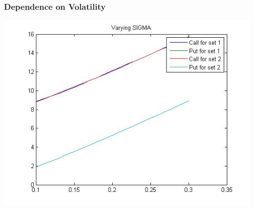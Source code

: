\documentclass[12pt]{article}
\begin{document}
        \subsubsection*{Dependence on Volatility}
    \begin{center}
      \includegraphics[width=6in]{sigma.jpg}
    \end{center}
\end{document}
